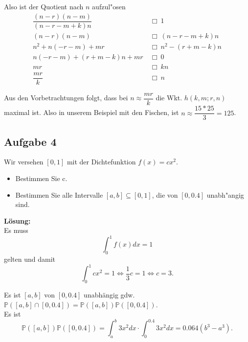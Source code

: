 \documentclass[11pt,a4paper,ngerman]{article}
\newcommand{\Prob}{\mathbb{P}}
\begin{document}
Also ist der Quotient nach $n$ aufzul"osen
\begin{align}
  \dfrac{(n-r)(n-m)}{(n-r-m+k)n} &\ \Box\  1 \\
  (n-r)(n-m) &\ \Box\  (n-r-m+k)n \\
  n^2 + n(-r-m) + mr &\ \Box\  n^2 - (r+m-k)n \\
  n(-r-m) + (r+m-k)n + mr &\ \Box\  0 \\
  mr &\ \Box\  kn \\
  \dfrac{mr}{k} &\ \Box\  n
\end{align}

Aus den Vorbetrachtungen folgt, dass bei $n \approx \dfrac{mr}{k}$ die Wkt.
$h(k,m; r,n)$ maximal ist. Also in unserem Beispiel mit den Fischen, ist $n
\approx \dfrac{15*25}{3} = 125$.

\subsection*{Aufgabe 4}

Wir versehen $[0, 1]$ mit der Dichtefunktion $f(x) = cx^2$.
\begin{itemize}
  \item Bestimmen Sie c.
  \item Bestimmen Sie alle Intervalle $[a, b] \subseteq [0, 1]$, die von $[0,
  0.4]$ unabh"angig sind.

\end{itemize}

\textbf{Lösung:}\\

Es muss
\[
    \int_0^1 f(x) dx = 1
\] gelten und damit
\[
    \int_0^1 c x^2 = 1 \Leftrightarrow \frac{1}{3}c = 1 \Leftrightarrow c = 3.
\]

Es ist $[a,b]$ von $[0,0.4]$ unabhängig gdw. $\Prob([a,b] \cap [0,0.4]) = \Prob([a,b]) \Prob([0,0.4])$.\\
Es ist
\[
    \Prob([a,b]) \Prob([0,0.4]) = \int_a^b 3x^2 dx \cdot \int_0^{0.4} 3x^2 dx = 0.064 (b^3 - a^3).
\]
\end{document}
